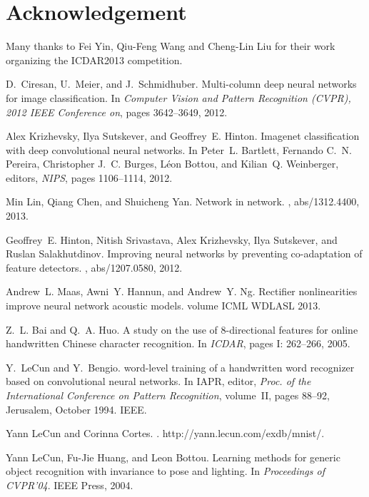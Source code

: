\documentclass{article}
\numberwithin{equation}{subsection}
\begin{document}
\section{Acknowledgement}
Many thanks to Fei Yin, Qiu-Feng Wang and Cheng-Lin Liu for their work organizing the ICDAR2013 competition.
\begin{thebibliography}{10}

D.~Ciresan, U.~Meier, and J.~Schmidhuber.
\newblock Multi-column deep neural networks for image classification.
\newblock In {\em Computer Vision and Pattern Recognition (CVPR), 2012 IEEE
  Conference on}, pages 3642--3649, 2012.

Alex Krizhevsky, Ilya Sutskever, and Geoffrey~E. Hinton.
\newblock Imagenet classification with deep convolutional neural networks.
\newblock In Peter~L. Bartlett, Fernando C.~N. Pereira, Christopher J.~C.
  Burges, Léon Bottou, and Kilian~Q. Weinberger, editors, {\em NIPS}, pages
  1106--1114, 2012.

Min Lin, Qiang Chen, and Shuicheng Yan.
\newblock Network in network.
, abs/1312.4400, 2013.

Geoffrey~E. Hinton, Nitish Srivastava, Alex Krizhevsky, Ilya Sutskever, and
  Ruslan Salakhutdinov.
\newblock Improving neural networks by preventing co-adaptation of feature
  detectors.
, abs/1207.0580, 2012.

Andrew~L. Maas, Awni~Y. Hannun, and Andrew~Y. Ng.
\newblock Rectifier nonlinearities improve neural network acoustic models.
\newblock volume ICML WDLASL 2013.

Z.~L. Bai and Q.~A. Huo.
\newblock A study on the use of 8-directional features for online handwritten
  {C}hinese character recognition.
\newblock In {\em ICDAR}, pages I: 262--266, 2005.

Y.~Le{C}un and Y.~Bengio.
\newblock word-level training of a handwritten word recognizer based on
  convolutional neural networks.
\newblock In IAPR, editor, {\em Proc. of the International Conference on
  Pattern Recognition}, volume~II, pages 88--92, Jerusalem, October 1994. IEEE.

Yann Le{C}un and Corinna Cortes.
.
\newblock http://yann.lecun.com/exdb/mnist/.

Yann Le{C}un, Fu-Jie Huang, and Leon Bottou.
\newblock Learning methods for generic object recognition with invariance to
  pose and lighting.
\newblock In {\em Proceedings of CVPR'04}. IEEE Press, 2004.


\end{thebibliography}
\end{document}
